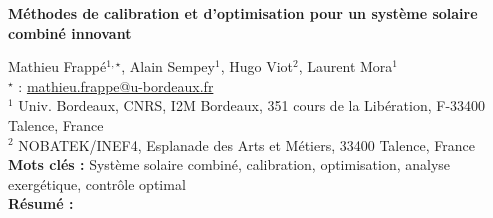 


    \newpage

\BgThispage

%
\begin{flushleft}
\addtocounter{section}{1}
{\Large \textbf{Méthodes de calibration et d'optimisation pour un système solaire combiné innovant}}\label{ref:6}
\end{flushleft}
%
Mathieu Frappé$^{1,\star}$, Alain Sempey$^{1}$, Hugo Viot$^{2}$, Laurent Mora$^{1}$\\[2mm]
$^{\star}$ \Letter : \url{mathieu.frappe@u-bordeaux.fr}\\[2mm]
{\footnotesize $^{1}$ Univ.  Bordeaux,  CNRS,  I2M  Bordeaux,  351  cours  de  la  Libération,  F-33400 Talence, France}\\
{\footnotesize $^{2}$ NOBATEK/INEF4, Esplanade des Arts et Métiers, 33400 Talence, France}\\
[4mm]
%
\noindent \textbf{Mots clés : } Système solaire combiné, calibration, optimisation, analyse exergétique, contrôle optimal\\[4mm]
%
\noindent \textbf{Résumé : } 

